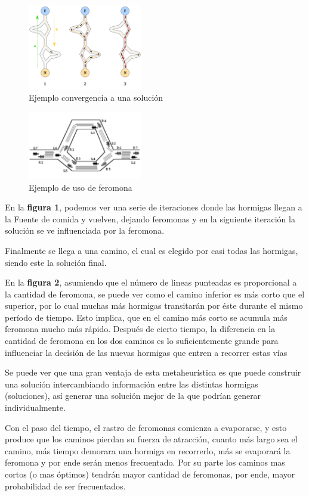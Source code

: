 \begin{figure}[h]
\centering
\caption{Ejemplo convergencia a una solución}
\includegraphics[width=5cm]{imagenes/feromona}
\end{figure}

\begin{figure}[h]
\caption{Ejemplo de uso de feromona}
\centering
\includegraphics[width=5cm]{imagenes/feromona2}
\end{figure}

En la \textbf{figura 1}, podemos ver una serie de iteraciones donde las hormigas llegan a la Fuente de comida y vuelven, dejando feromonas y en la siguiente iteración la solución se ve influenciada por la feromona. 

Finalmente se llega a una camino, el cual es elegido por casi todas las hormigas, siendo este la soluci\'on final.

En la \textbf{figura 2}, asumiendo que el número de lineas punteadas es proporcional a la cantidad de feromona, se puede ver como el camino inferior es más corto que el superior, por lo cual muchas más hormigas transitarán por éste durante el mismo per\'iodo de tiempo. Esto implica, que en el camino más corto se acumula más feromona mucho más rápido. Después de cierto tiempo, la diferencia en la cantidad de feromona en los dos caminos es lo suficientemente grande para influenciar la decisión de las nuevas hormigas que entren a recorrer estas vías

Se puede ver que una gran ventaja de esta metaheurística es que puede construir una solución intercambiando información entre las distintas hormigas (soluciones), así generar una solución mejor de la que podrían generar individualmente.

Con el paso del tiempo, el rastro de feromonas comienza a evaporarse, y esto produce que los caminos pierdan su fuerza de atracción, cuanto más largo sea el camino, más tiempo demorara una hormiga en recorrerlo, más se evaporará la feromona y por ende serán menos frecuentado. Por su parte los caminos mas cortos (o mas óptimos) tendrán mayor cantidad de feromonas, por ende, mayor probabilidad de ser frecuentados.

